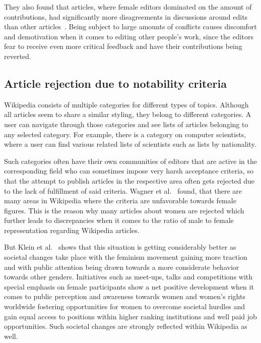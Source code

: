 \documentclass[a4paper, 11pt]{article}
\begin{document}
They also found that articles, where female editors dominated on the amount of contributions, had significantly more disagreements in discussions around edits than other articles~\cite{lam2011wp}. Being subject to large amounts of conflicts causes discomfort and demotivation when it comes to editing other people’s work, since the editors fear to receive even more critical feedback and have their contributions being reverted.

\subsection{Article rejection due to notability criteria} \label{sec:gender-gap-wikipedia:notability}
Wikipedia consists of multiple categories for different types of topics. Although all articles seem to share a similar styling, they belong to different categories. A user can navigate through those categories and see lists of articles belonging to any selected category. For example, there is a category on computer scientists, where a user can find various related lists of scientists such as lists by nationality.

Such categories often have their own communities of editors that are active in the corresponding field who can sometimes impose very harsh acceptance criteria, so that the attempt to publish articles in the respective area often gets rejected due to the lack of fulfillment of said criteria. Wagner et al.~\cite{wagner2016women} found, that there are many areas in Wikipedia where the criteria are unfavorable towards female figures. This is the reason why many articles about women are rejected which further leads to discrepancies when it comes to the ratio of male to female representation regarding Wikipedia articles.

But Klein et al.~\cite{klein2016monitoring} shows that this situation is getting considerably better as societal changes take place with the feminism movement gaining more traction and with public attention being drawn towards a more considerate behavior towards other genders. Initiatives such as meet-ups, talks and competitions with special emphasis on female participants show a net positive development when it comes to public perception and awareness towards women and women’s rights worldwide fostering opportunities for women to overcome societal hurdles and gain equal access to positions within higher ranking institutions and well paid job opportunities. Such societal changes are strongly reflected within Wikipedia as well.
\end{document}
